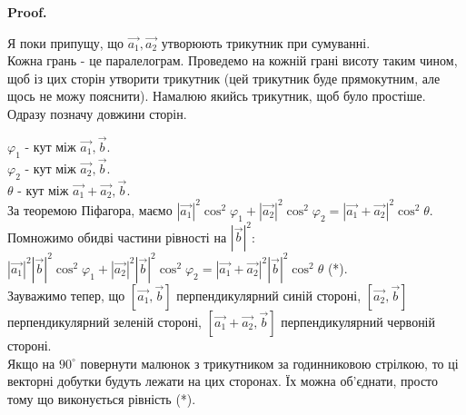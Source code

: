 \documentclass[a4paper, 10pt]{extarticle}
\makeatletter
\def\qed{$\blacksquare$}
\def\qed{$\blacksquare$}
\theoremstyle{theoremdd}
\theoremstyle{theoremdd}
\theoremstyle{theoremdd}
\theoremstyle{theoremdd}
\theoremstyle{theoremdd}
\theoremstyle{theoremdd}
\theoremstyle{theoremdd}
\theoremstyle{theoremdd}
\renewenvironment{proof}[1][Proof.\\]{\par
\pushQED{\hfill \qed}%
\normalfont \topsep6\p@\@plus6\p@\relax
\trivlist
\item\relax
{\bfseries
#1\@addpunct{.}}\hspace\labelsep\ignorespaces
}{%
\popQED\endtrivlist\@endpefalse
}
\makeatother
\begin{document}
\begin{proof}
\begin{figure}[H]
\end{figure}
Я поки припущу, що $\vec{a_1},\vec{a_2}$ утворюють трикутник при сумуванні.\\
Кожна грань - це паралелограм. Проведемо на кожній грані висоту таким чином, щоб із цих сторін утворити трикутник (цей трикутник буде прямокутним, але щось не можу пояснити). Намалюю якийсь трикутник, щоб було простіше. Одразу позначу довжини сторін.
\begin{figure}[H]
\centering
{}
\end{figure}
$\varphi_1$ - кут між $\vec{a_1}, \vec{b}$.\\
$\varphi_2$ - кут між $\vec{a_2}, \vec{b}$.\\
$\theta$ - кут між $\vec{a_1}+\vec{a_2}, \vec{b}$.\\
За теоремою Піфагора, маємо $|\vec{a_1}|^2 \cos^2 \varphi_1 + |\vec{a_2}|^2 \cos^2 \varphi_2 = |\vec{a_1}+\vec{a_2}|^2 \cos^2 \theta$.\\
Помножимо обидві частини рівності на $|\vec{b}|^2$:\\
$|\vec{a_1}|^2 |\vec{b}|^2 \cos^2 \varphi_1 + |\vec{a_2}|^2 |\vec{b}|^2 \cos^2 \varphi_2 = |\vec{a_1}+\vec{a_2}|^2 |\vec{b}|^2 \cos^2 \theta$ (*).\\
Зауважимо тепер, що $[\vec{a_1},\vec{b}]$ перпендикулярний синій стороні, $[\vec{a_2},\vec{b}]$ перпендикулярний зеленій стороні, $[\vec{a_1}+\vec{a_2},\vec{b}]$ перпендикулярний червоній стороні.\\
Якщо на $90^\circ$ повернути малюнок з трикутником за годинниковою стрілкою, то ці векторні добутки будуть лежати на цих сторонах. Їх можна об'єднати, просто тому що виконується рівність (*).
\end{proof}
\end{document}
